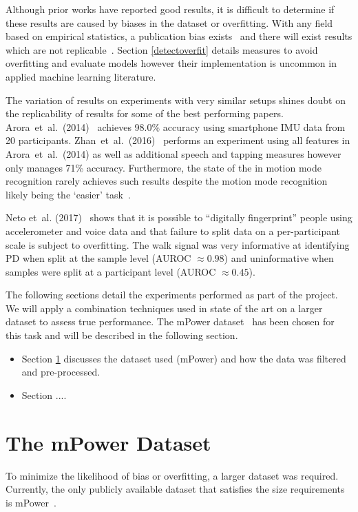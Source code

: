 \documentclass[12pt, twoside]{book}
\begin{document}
Although prior works have reported good results, it is difficult to determine if these results are caused by biases in the dataset or overfitting. With any field based on empirical statistics, a publication bias exists~\cite{publicationbias} and there will exist results which are not replicable~\cite{replicability}. Section \ref{detectoverfit} details measures to avoid overfitting and evaluate models however their implementation is uncommon in applied machine learning literature. 

The variation of results on experiments with very similar setups shines doubt on the replicability of results for some of the best performing papers. Arora~et~al.~(2014)~\cite{arora2014high} achieves 98.0\% accuracy using smartphone IMU data from 20 participants. Zhan~et~al.~(2016)~\cite{zhan2016high} performs an experiment using all features in Arora~et~al.~(2014) as well as additional speech and tapping measures however only manages 71\% accuracy. Furthermore, the state of the in motion mode recognition rarely achieves such results despite the motion mode recognition likely being the `easier' task~\cite{motionmoderecognition}. 

Neto et~al. (2017)~\cite{mpowerneto2017analysis} shows that it is possible to ``digitally fingerprint'' people using accelerometer and voice data and that failure to split data on a per-participant scale is subject to overfitting. The walk signal was very informative at identifying PD when split at the sample level (AUROC $\approx 0.98$) and uninformative when samples were split at a participant level (AUROC $\approx 0.45$). 
 
The following sections detail the experiments performed as part of the project. We will apply a combination techniques used in state of the art on a larger dataset to assess true performance. The mPower dataset~\cite{mpower} has been chosen for this  task and will be described in the following section.

\begin{itemize}
\item Section \ref{mpower} discusses the dataset used (mPower) and how the data was filtered and pre-processed.
\item Section ....
\end{itemize}

\section{The mPower Dataset}
\label{mpower}
To minimize the likelihood of bias or overfitting, a larger dataset was required. Currently, the only publicly available dataset that satisfies the size requirements is mPower~\cite{mpower}. 
\end{document}
